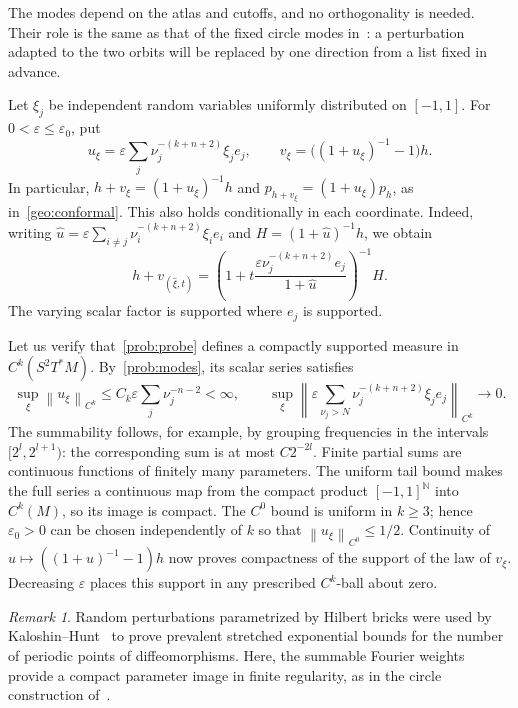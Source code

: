\documentclass[10pt,oneside,reqno]{amsproc}
\numberwithin{equation}{section}
\theoremstyle{definition}
\theoremstyle{remark}
\newtheorem{remark}[theorem]{Remark}
\newcommand{\norm}[1]{\left\|#1\right\|}
\newcommand{\eps}{\varepsilon}
\renewcommand{\ge}{\geqslant}
\renewcommand{\le}{\leqslant}
\begin{document}
The modes depend on the atlas and cutoffs, and no orthogonality is needed. Their role is the same as that of the fixed circle modes in~\cite[Appendix A, Proposition~A.3]{DK}: a perturbation adapted to the two orbits will be replaced by one direction from a list fixed in advance.

Let $\xi_j$ be independent random variables uniformly distributed on $[-1,1]$. For $0<\eps\le\eps_0$, put
\begin{equation}
 u_\xi=\eps\sum_j\nu_j^{-(k+n+2)}\xi_j e_j,\qquad v_\xi=\bigl((1+u_\xi)^{-1}-1\bigr)h.
 \label{prob:probe}
\end{equation}
In particular, $h+v_\xi=(1+u_\xi)^{-1}h$ and $p_{h+v_\xi}=(1+u_\xi)p_h$, as in~\eqref{geo:conformal}. This also holds conditionally in each coordinate. Indeed, writing $\widehat u=\eps\sum_{i\ne j}\nu_i^{-(k+n+2)}\xi_i e_i$ and $H=(1+\widehat u)^{-1}h$, we obtain
\[
 h+v_{(\widehat\xi,t)}=\left(1+t\frac{\eps\nu_j^{-(k+n+2)}e_j}{1+\widehat u}\right)^{-1}H.
\]
The varying scalar factor is supported where $e_j$ is supported.

Let us verify that~\eqref{prob:probe} defines a compactly supported measure in $C^k(S^2T^*M)$. By~\eqref{prob:modes}, its scalar series satisfies
\[
 \sup_\xi\norm{u_\xi}_{C^k}\le C_k\eps\sum_j\nu_j^{-n-2}<\infty,\qquad \sup_\xi\left\|\eps\sum_{\nu_j>N}\nu_j^{-(k+n+2)}\xi_j e_j\right\|_{C^k}\longrightarrow0.
\]
The summability follows, for example, by grouping frequencies in the intervals $[2^l,2^{l+1})$: the corresponding sum is at most $C2^{-2l}$. Finite partial sums are continuous functions of finitely many parameters. The uniform tail bound makes the full series a continuous map from the compact product $[-1,1]^{\mathbb N}$ into $C^k(M)$, so its image is compact. The $C^0$ bound is uniform in $k\ge3$; hence $\eps_0>0$ can be chosen independently of $k$ so that $\norm{u_\xi}_{C^0}\le1/2$. Continuity of $u\mapsto((1+u)^{-1}-1)h$ now proves compactness of the support of the law of $v_\xi$. Decreasing $\eps$ places this support in any prescribed $C^k$-ball about zero.

\begin{remark}
Random perturbations parametrized by Hilbert bricks were used by Kaloshin--Hunt~\cite[Sections~1.3 and~2.3]{KH} to prove prevalent stretched exponential bounds for the number of periodic points of diffeomorphisms. Here, the summable Fourier weights provide a compact parameter image in finite regularity, as in the circle construction of~\cite[Appendix A.3]{DK}.
\end{remark}
\end{document}
